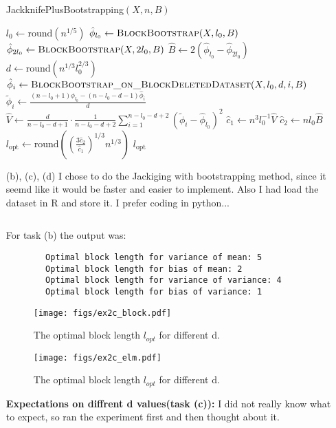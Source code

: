 \documentclass[a4paper,12pt]{article}
\theoremstyle{breaktheorem}
\theoremstyle{exerciseStyle}
\theoremstyle{solutionStyle}
\begin{document}
\begin{enumerate}
          \begin{algorithm}[H]
              \caption{JackknifePlusBootstrapping$(X, n, B)$}
              \begin{algorithmic}[1]
                  \State $l_0 \gets \text{round}(n^{1/5})$ 
                  \State $\hat{\phi}_{l_0} \gets \textsc{BlockBootstrap}(X, l_0, B)$ 
                  \State $\hat{\phi}_{2l_0} \gets \textsc{BlockBootstrap}(X, 2l_0, B)$ 
                  \State $\hat{B} \gets 2 ( \hat{\phi}_{l_0} - \hat{\phi}_{2l_0} )$ 
                  \State $d \gets \text{round}(n^{1/3} l_0^{2/3})$ 
                  \State $\hat{\phi}_i \gets \textsc{BlockBootstrap\_on\_BlockDeletedDataset}(X, l_0, d, i, B)$ 
                  \State $\tilde{\phi}_i \gets \frac{(n - l_0 + 1) \hat{\phi}_{l_0} - (n - l_0 - d - 1) \hat{\phi}_i}{d}$
                  \EndFor
                  \State $\hat{V} \gets \frac{d}{n - l_0 - d + 1} \cdot \frac{1}{n - l_0 - d + 2} \sum_{i=1}^{n - l_0 - d + 2} ( \tilde{\phi}_i - \hat{\phi}_{l_0} )^2$
                  \State $\hat{c}_1 \gets n^3 l_0^{-1} \hat{V}$
                  \State $\hat{c}_2 \gets n l_0 \hat{B}$
                  \State $l_{\text{opt}} \gets \text{round} \left( \left( \frac{3 \hat{c}_2}{\hat{c}_1} \right)^{1/3} n^{1/3} \right)$
                  \State \Return $l_{\text{opt}}$
              \end{algorithmic}
          \end{algorithm}

    \item [(b), (c), (d)]
          I chose to do the Jackiging with bootstrapping method, since it seemd like it would be faster and easier to implement.
          Also I had load the dataset in R and store it. I prefer coding in python...
          \inputminted[linenos, breaklines, frame=lines]{python}{ex2b.py}
          For task (b) the output was:
          \begin{verbatim}
        Optimal block length for variance of mean: 5
        Optimal block length for bias of mean: 2
        Optimal block length for variance of variance: 4
        Optimal block length for bias of variance: 1
        \end{verbatim}
          \begin{figure}[h]
              \centering
              \texttt{[image: figs/ex2c\_block.pdf]}
              \caption{The optimal block length $l_{opt}$ for different d.}
              \label{fig:ex2b}
          \end{figure}
          \begin{figure}[h]
              \centering
              \texttt{[image: figs/ex2c\_elm.pdf]}
              \caption{The optimal block length $l_{opt}$ for different d.}
              \label{fig:ex2b_elm}
          \end{figure}
          \textbf{Expectations on diffrent d values(task (c)):}
          I did not really know what to expect, so ran the experiment first and then thought about it.


\end{enumerate}
\end{document}
